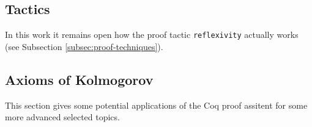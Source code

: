 	
	
	\clearpage

\subsection{Tactics}	
In this work it remains open how the proof tactic \lstinline!reflexivity! actually works\label{sec:reflexivity} (see Subsection \ref{subsec:proof-techniques}).
	
	
\subsection{Axioms of Kolmogorov}
\label{subsec:AxiomsOfKolmogorov }
 
 This section gives some potential applications of the Coq proof assitent for some more advanced selected topics.
 	
 

